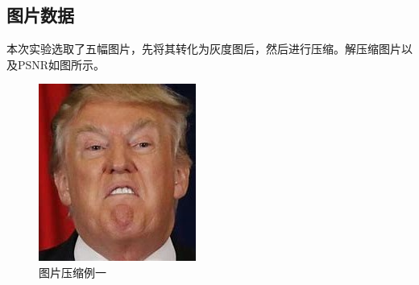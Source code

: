 \documentclass[withoutpreface,bwprint]{cumcmthesis}
\begin{document}
\subsection{图片数据}
本次实验选取了五幅图片，先将其转化为灰度图后，然后进行压缩。解压缩图片以及PSNR如图所示。
\begin{figure}[H]
    \centering
    \includegraphics[width=\textwidth]{trump}
    \caption{图片压缩例一}
    \label{图4}
\end{figure}
\end{document}
